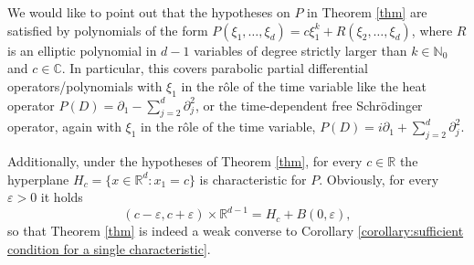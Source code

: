 \documentclass[10pt,leqno]{amsart}
\theoremstyle{definition}
\newcommand{\R}{\mathbb R}
\newcommand{\N}{\mathbb N}
\newcommand{\C}{\mathbb C}
\let\epsilon\varepsilon
\begin{document}
We would like to point out that the hypotheses on $P$ in Theorem \ref{thm} are satisfied by polynomials of the form $P(\xi_1,\ldots,\xi_d)=c\xi_1^k+R(\xi_2,\ldots,\xi_d)$, where $R$ is an elliptic polynomial in $d-1$ variables of degree strictly larger than $k\in\N_0$ and $c\in\C$. In particular, this covers parabolic partial differential operators/polynomials with $\xi_1$ in the r\^{o}le of the time variable like the heat operator $P(D)=\partial_1-\sum_{j=2}^d\partial_j^2$, or the time-dependent free Schr\"odinger operator, again with $\xi_1$ in the r\^{o}le of the time variable, $P(D)=i\partial_1+\sum_{j=2}^d \partial_j^2$. 

Additionally, under the hypotheses of Theorem \ref{thm}, for every $c\in\R$ the hyperplane $H_c=\{x\in\R^d\colon x_1=c\}$ is characteristic for $P$. Obviously, for every $\varepsilon>0$ it holds
$$\left(c-\epsilon,c+\epsilon\right)\times\R^{d-1}=H_c+B(0,\epsilon),$$
so that Theorem \ref{thm} is indeed a weak converse to Corollary \ref{corollary:sufficient condition for a single characteristic}.
\end{document}
